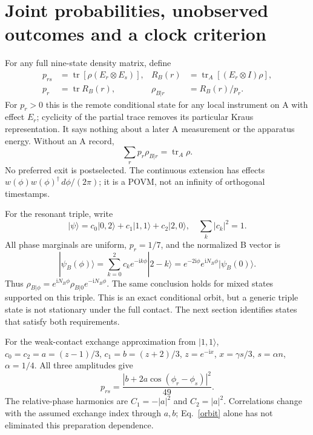 \documentclass[11pt,a4paper]{article}
\newcommand{\ii}{\mathrm i}
\newcommand{\tr}{\operatorname{tr}}
\newcommand{\ket}[1]{|#1\rangle}
\begin{document}
\newpage
\section{Joint probabilities, unobserved outcomes and a clock criterion}
For any full nine-state density matrix, define
\begin{align}
 p_{rs}&=\tr[\rho(E_r\otimes E_s)],&
 R_B(r)&=\tr_A[(E_r\otimes I)\rho],\label{prob}\\
 p_r&=\tr R_B(r),&\rho_{B|r}&=R_B(r)/p_r.
\end{align}
For $p_r>0$ this is the remote conditional state for any local instrument
on A with effect $E_r$; cyclicity of the partial trace removes its
particular Kraus representation. It says nothing about a later A
measurement or the apparatus energy. Without an A record,
\begin{equation}
 \sum_r p_r\rho_{B|r}=\tr_A\rho.\label{unread}
\end{equation}
No preferred exit is postselected. The continuous extension has effects
$w(\phi)w(\phi)^\dagger\,d\phi/(2\pi)$; it is a POVM, not an infinity
of orthogonal timestamps.

For the resonant triple, write
\begin{equation}
 \ket\psi=c_0\ket{0,2}+c_1\ket{1,1}+c_2\ket{2,0},\quad
 \sum_k|c_k|^2=1.
\end{equation}
All phase marginals are uniform, $p_r=1/7$, and the normalized B vector is
\begin{equation}
 \ket{\psi_B(\phi)}=\sum_{k=0}^2c_k e^{-\ii k\phi}\ket{2-k}
 =e^{-2\ii\phi}e^{\ii N_B\phi}\ket{\psi_B(0)}.\label{orbit}
\end{equation}
Thus $\rho_{B|\phi}=e^{\ii N_B\phi}\rho_{B|0}e^{-\ii N_B\phi}$.
The same conclusion holds for mixed states supported on this triple.
This is an exact conditional orbit, but a generic triple state is not
stationary under the full contact. The next section identifies states
that satisfy both requirements.

For the weak-contact exchange approximation from $\ket{1,1}$,
$c_0=c_2=a=(z-1)/3$, $c_1=b=(z+2)/3$, $z=e^{-\ii x}$,
$x=\gamma s/3$, $s=\alpha n$, $\alpha=1/4$. All three amplitudes give
\begin{equation}
 p_{rs}=\frac{|b+2a\cos(\phi_r-\phi_s)|^2}{49}.\label{tripleprob}
\end{equation}
The relative-phase harmonics are $C_1=-|a|^2$ and $C_2=|a|^2$.
Correlations change with the assumed exchange index through $a,b$;
Eq.~\eqref{orbit} alone has not eliminated this preparation dependence.
\end{document}
